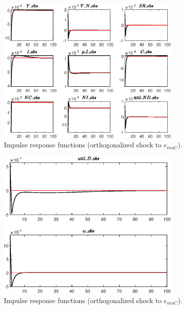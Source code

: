 \begin{figure}[H]
\centering 
\includegraphics[width=0.80\textwidth]{RBC_sectoral/graphs/RBC_sectoral_IRF_e_muC1}
\caption{Impulse response functions (orthogonalized shock to ${e_{muC}}$).}\label{Fig:IRF:e_muC:1}
\end{figure}
 
\begin{figure}[H]
\centering 
\includegraphics[width=0.80\textwidth]{RBC_sectoral/graphs/RBC_sectoral_IRF_e_muC2}
\caption{Impulse response functions (orthogonalized shock to ${e_{muC}}$).}\label{Fig:IRF:e_muC:2}
\end{figure}
 
